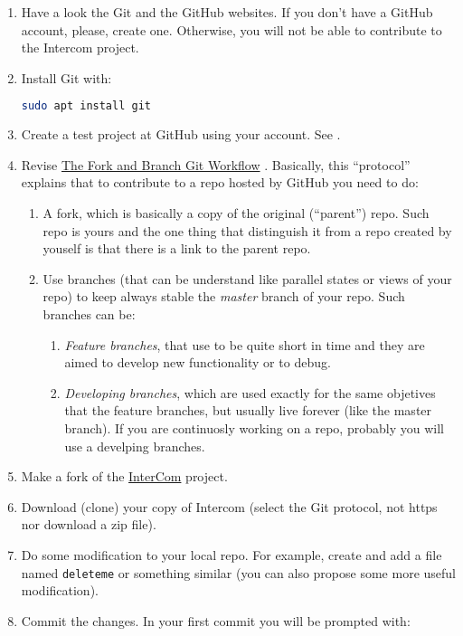 \begin{enumerate}
\item Have a look the Git \cite{Git, Git-book} and the GitHub
  \cite{GitHub} websites. If you don't have a GitHub account, please,
  create one. Otherwise, you will not be able to contribute to the
  Intercom project.
\item Install Git with:
  \begin{lstlisting}[language=bash]
    sudo apt install git
  \end{lstlisting}
\item Create a test project at GitHub using your account. See
  \cite{GitHub-HW}.
\item Revise
  \href{https://github.com/vicente-gonzalez-ruiz/fork_and_branch_git_workflow}{The
    Fork and Branch Git Workflow} \cite{Git-workflow}. Basically, this
  ``protocol'' explains that to contribute to a repo hosted by GitHub
  you need to do:
  \begin{enumerate}
    \item A fork, which is basically a copy of the original
      (``parent'') repo. Such repo is yours and the one thing that
      distinguish it from a repo created by youself is that there is a
      link to the parent repo.
    \item Use branches (that can be understand like parallel states or
      views of your repo) to keep always stable the \emph{master}
      branch of your repo. Such branches can be:
      \begin{enumerate}
        \item \emph{Feature branches}, that use to be quite short in
          time and they are aimed to develop new functionality or to
          debug.
        \item \emph{Developing branches}, which are used exactly for
          the same objetives that the feature branches, but usually
          live forever (like the master branch). If you are
          continuosly working on a repo, probably you will use a
          develping branches.
      \end{enumerate}
  \end{enumerate}
\item Make a fork of the \href{https://github.com/Tecnologias-multimedia/intercom}{InterCom} project.
\item Download (clone) your copy of Intercom (select the Git protocol,
  not https nor download a zip file).
\item Do some modification to your local repo. For example, create and
  add a file named \texttt{deleteme} or something similar (you can
  also propose some more useful modification).
\item Commit the changes. In your first commit you will be prompted with:


\end{enumerate}
